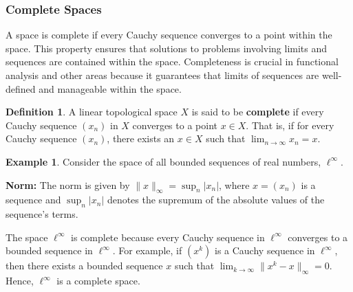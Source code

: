 \documentclass[12pt, reqno]{amsart}
\theoremstyle{definition}
\newtheorem{definition}[theorem]{Definition}
\newtheorem{example}[theorem]{Example}
\numberwithin{equation}{section}
\newcommand{\dR}{{\mathbb R}}
\begin{document}
\subsubsection{Complete Spaces}
A space is complete if every Cauchy sequence converges to a point within the space. This property ensures that solutions to problems involving limits and sequences are contained within the space. Completeness is crucial in functional analysis and other areas because it guarantees that limits of sequences are well-defined and manageable within the space.

\begin{definition}
    A linear topological space $X$ is said to be \textbf{complete} if every Cauchy sequence $(x_n)$ in $X$ converges to a point $x \in X$. That is, if for every Cauchy sequence $(x_n)$, there exists an $x \in X$ such that $ \lim_{n \to \infty} x_n = x $.
\end{definition}

\begin{comment}
\begin{example}
    Consider the space of real numbers $\dR$ with the usual metric, where the metric is given by $d(x, y) = |x - y|$.

Observe that:
\begin{itemize}
  \item \textbf{Space:} $\dR$ (the set of all real numbers).
  \item \textbf{Metric:} $d(x, y) = |x - y|$, which defines the topology of the space.
\end{itemize}

Any Cauchy sequence of real numbers $(x_n)$ will converge to a real number $x$ in $\dR$. For example, the sequence $x_n = \frac{1}{n}$ is a Cauchy sequence in $\dR$ because as $n$ becomes large, the terms of the sequence get arbitrarily close to 0. The limit of this sequence is 0, which is a real number in $\dR$, so $\dR$ is complete.
\end{example}    
\end{comment}

\begin{example}
Consider the space of all bounded sequences of real numbers, $ \ell^\infty $.

\textbf{Norm:} The norm is given by $ \|x\|_\infty = \sup_{n} |x_n| $, where $ x = (x_n) $ is a sequence and $ \sup_{n} |x_n| $ denotes the supremum of the absolute values of the sequence's terms.


The space $ \ell^\infty $ is complete because every Cauchy sequence in $ \ell^\infty $ converges to a bounded sequence in $ \ell^\infty $. For example, if $ (x^k) $ is a Cauchy sequence in $ \ell^\infty $, then there exists a bounded sequence $ x $ such that $ \lim_{k \to \infty} \|x^k - x\|_\infty = 0 $. Hence, $ \ell^\infty $ is a complete space.
\end{example}
\end{document}
